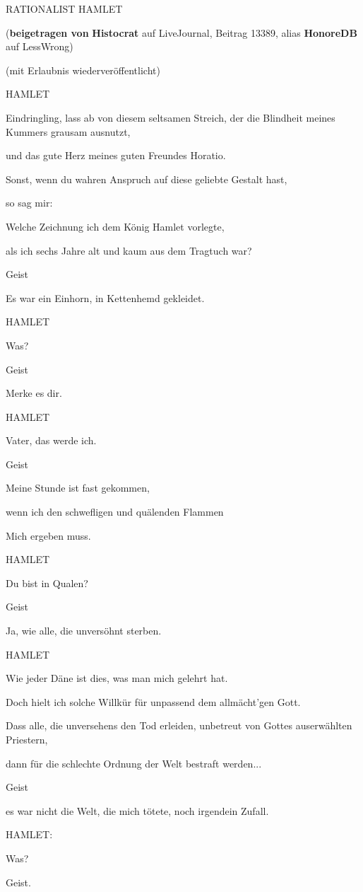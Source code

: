{RATIONALIST HAMLET

(\textbf{beigetragen von} \textbf{Histocrat} auf LiveJournal, Beitrag 13389, alias \textbf{HonoreDB} auf LessWrong)

(mit Erlaubnis wiederveröffentlicht)

HAMLET

Eindringling, lass ab von diesem seltsamen Streich, der die Blindheit meines Kummers grausam ausnutzt,

und das gute Herz meines guten Freundes Horatio.

Sonst, wenn du wahren Anspruch auf diese geliebte Gestalt hast,

so sag mir:

Welche Zeichnung ich dem König Hamlet vorlegte,

als ich sechs Jahre alt und kaum aus dem Tragtuch war?

Geist

Es war ein Einhorn, in Kettenhemd gekleidet.

HAMLET

Was?

Geist

Merke es dir.

HAMLET

Vater, das werde ich.

Geist

Meine Stunde ist fast gekommen,

wenn ich den schwefligen und quälenden Flammen

Mich ergeben muss.

HAMLET

Du bist in Qualen?

Geist

Ja, wie alle, die unversöhnt sterben.

HAMLET

Wie jeder Däne ist dies, was man mich gelehrt hat.

Doch hielt ich solche Willkür für unpassend dem allmächt'gen Gott.

Dass alle, die unversehens den Tod erleiden, unbetreut von Gottes auserwählten Priestern,

dann für die schlechte Ordnung der Welt bestraft werden...

Geist

es war nicht die Welt, die mich tötete, noch irgendein Zufall.

HAMLET:

Was?

Geist.

}
